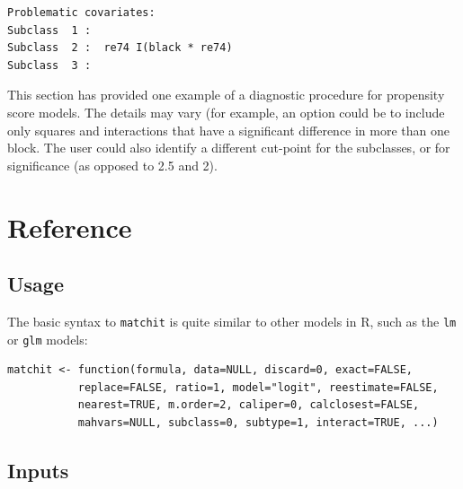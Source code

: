 \documentclass[oneside,letterpaper,titlepage]{article}
\begin{document}
\begin{verbatim}
Problematic covariates:
Subclass  1 :  
Subclass  2 :  re74 I(black * re74)
Subclass  3 :  
\end{verbatim}

This section has provided one example of a diagnostic procedure for propensity score models.  The details may vary (for 
example, an option could be to include only squares and interactions that have a significant difference in more than one 
block.  The user could also identify a different cut-point for the subclasses, or for significance (as opposed to 2.5
and 2).

\section{Reference}

\subsection{Usage}

The basic syntax to \texttt{matchit} is quite similar to other models in R, such as the
\texttt{lm} or \texttt{glm} models: 

\begin{verbatim}
matchit <- function(formula, data=NULL, discard=0, exact=FALSE,
           replace=FALSE, ratio=1, model="logit", reestimate=FALSE,
           nearest=TRUE, m.order=2, caliper=0, calclosest=FALSE,
           mahvars=NULL, subclass=0, subtype=1, interact=TRUE, ...)
\end{verbatim}

\subsection{Inputs}
\end{document}
